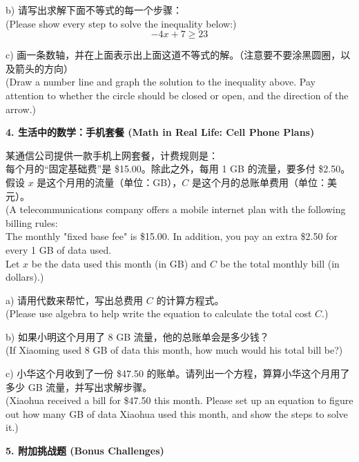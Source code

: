 \documentclass[12pt]{article}
\begin{document}
b) 请写出求解下面不等式的每一个步骤：\\
(Please show every step to solve the inequality below:)
\[ -4x + 7 \ge 23 \]
\vspace{4cm}

c) 画一条数轴，并在上面表示出上面这道不等式的解。（注意要不要涂黑圆圈，以及箭头的方向）\\
(Draw a number line and graph the solution to the inequality above. Pay attention to whether the circle should be closed or open, and the direction of the arrow.)
\vspace{4cm}

\newpage

\textbf{4. 生活中的数学：手机套餐 (Math in Real Life: Cell Phone Plans)}

某通信公司提供一款手机上网套餐，计费规则是：\\
每个月的“固定基础费”是 \$15.00。除此之外，每用 1 GB 的流量，要多付 \$2.50。\\
假设 $x$ 是这个月用的流量（单位：GB），$C$ 是这个月的总账单费用（单位：美元）。\\
(A telecommunications company offers a mobile internet plan with the following billing rules: \\
The monthly "fixed base fee" is \$15.00. In addition, you pay an extra \$2.50 for every 1 GB of data used. \\
Let $x$ be the data used this month (in GB) and $C$ be the total monthly bill (in dollars).)

a) 请用代数来帮忙，写出总费用 $C$ 的计算方程式。\\
(Please use algebra to help write the equation to calculate the total cost $C$.)
\vspace{2.5cm}

b) 如果小明这个月用了 8 GB 流量，他的总账单会是多少钱？\\
(If Xiaoming used 8 GB of data this month, how much would his total bill be?)
\vspace{3cm}

c) 小华这个月收到了一份 \$47.50 的账单。请列出一个方程，算算小华这个月用了多少 GB 流量，并写出求解步骤。\\
(Xiaohua received a bill for \$47.50 this month. Please set up an equation to figure out how many GB of data Xiaohua used this month, and show the steps to solve it.)
\vspace{6cm}

\newpage

\textbf{5. 附加挑战题 (Bonus Challenges)}
\end{document}
